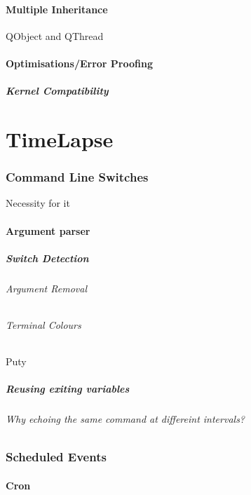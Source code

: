 \documentclass[11pt]{article} %
\begin{document}
\subsection{Multiple Inheritance}{QObject and QThread}
\subsection{Optimisations/Error Proofing}
\subsubsection{Kernel Compatibility}


\part{TimeLapse}
\section{Command Line Switches}{Necessity for it}
\subsection{Argument parser}
\subsubsection{Switch Detection}
\paragraph{Argument Removal}
\paragraph{Terminal Colours}{Puty}
\subsubsection{Reusing exiting variables}
\paragraph{Why echoing the same command at differeint intervals?}
\section{Scheduled Events}
\subsection{Cron}
\end{document}
